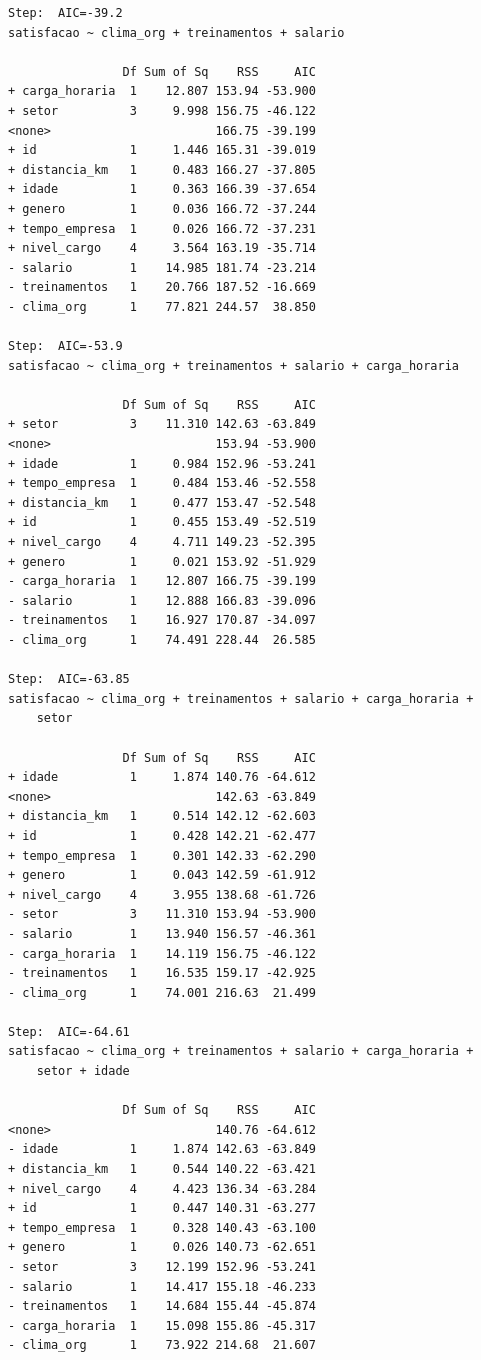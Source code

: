 \documentclass[
  letterpaper,
  DIV=11,
  numbers=noendperiod]{scrartcl}
\begin{document}
\begin{verbatim}
Step:  AIC=-39.2
satisfacao ~ clima_org + treinamentos + salario

                Df Sum of Sq    RSS     AIC
+ carga_horaria  1    12.807 153.94 -53.900
+ setor          3     9.998 156.75 -46.122
<none>                       166.75 -39.199
+ id             1     1.446 165.31 -39.019
+ distancia_km   1     0.483 166.27 -37.805
+ idade          1     0.363 166.39 -37.654
+ genero         1     0.036 166.72 -37.244
+ tempo_empresa  1     0.026 166.72 -37.231
+ nivel_cargo    4     3.564 163.19 -35.714
- salario        1    14.985 181.74 -23.214
- treinamentos   1    20.766 187.52 -16.669
- clima_org      1    77.821 244.57  38.850

Step:  AIC=-53.9
satisfacao ~ clima_org + treinamentos + salario + carga_horaria

                Df Sum of Sq    RSS     AIC
+ setor          3    11.310 142.63 -63.849
<none>                       153.94 -53.900
+ idade          1     0.984 152.96 -53.241
+ tempo_empresa  1     0.484 153.46 -52.558
+ distancia_km   1     0.477 153.47 -52.548
+ id             1     0.455 153.49 -52.519
+ nivel_cargo    4     4.711 149.23 -52.395
+ genero         1     0.021 153.92 -51.929
- carga_horaria  1    12.807 166.75 -39.199
- salario        1    12.888 166.83 -39.096
- treinamentos   1    16.927 170.87 -34.097
- clima_org      1    74.491 228.44  26.585

Step:  AIC=-63.85
satisfacao ~ clima_org + treinamentos + salario + carga_horaria + 
    setor

                Df Sum of Sq    RSS     AIC
+ idade          1     1.874 140.76 -64.612
<none>                       142.63 -63.849
+ distancia_km   1     0.514 142.12 -62.603
+ id             1     0.428 142.21 -62.477
+ tempo_empresa  1     0.301 142.33 -62.290
+ genero         1     0.043 142.59 -61.912
+ nivel_cargo    4     3.955 138.68 -61.726
- setor          3    11.310 153.94 -53.900
- salario        1    13.940 156.57 -46.361
- carga_horaria  1    14.119 156.75 -46.122
- treinamentos   1    16.535 159.17 -42.925
- clima_org      1    74.001 216.63  21.499

Step:  AIC=-64.61
satisfacao ~ clima_org + treinamentos + salario + carga_horaria + 
    setor + idade

                Df Sum of Sq    RSS     AIC
<none>                       140.76 -64.612
- idade          1     1.874 142.63 -63.849
+ distancia_km   1     0.544 140.22 -63.421
+ nivel_cargo    4     4.423 136.34 -63.284
+ id             1     0.447 140.31 -63.277
+ tempo_empresa  1     0.328 140.43 -63.100
+ genero         1     0.026 140.73 -62.651
- setor          3    12.199 152.96 -53.241
- salario        1    14.417 155.18 -46.233
- treinamentos   1    14.684 155.44 -45.874
- carga_horaria  1    15.098 155.86 -45.317
- clima_org      1    73.922 214.68  21.607
\end{verbatim}
\end{document}
